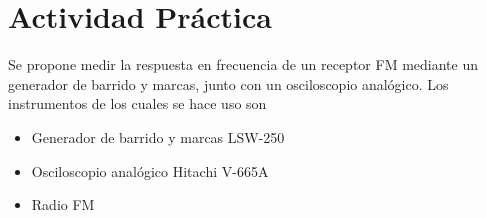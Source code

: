   \pagebreak
  \section{Actividad Práctica}
    Se propone medir la respuesta en frecuencia de un receptor FM mediante un generador de barrido y marcas, junto
    con un osciloscopio analógico. Los instrumentos de los cuales se hace uso son

    \begin{itemize}
      \item Generador de barrido y marcas LSW-250
      \item Osciloscopio analógico Hitachi V-665A
      \item Radio FM
    \end{itemize}
    
    
    
    
